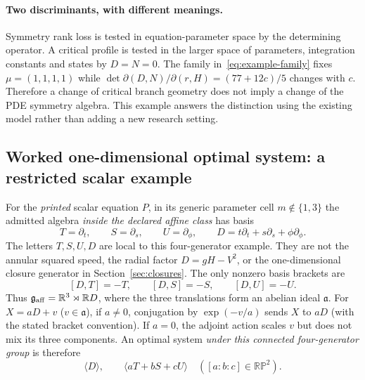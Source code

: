 \documentclass[12pt,a4paper,oneside]{report}
\numberwithin{equation}{chapter}
\theoremstyle{remark}\newtheorem{remark}[theorem]{Remark}
\begin{document}
\paragraph{Two discriminants, with different meanings.}
Symmetry rank loss is tested in equation-parameter space by the determining
operator. A critical profile is tested in the larger space of parameters,
integration constants and states by $D=N=0$. The family
in~\eqref{eq:example-family} fixes $\mu=(1,1,1,1)$ while
$\det\partial(D,N)/\partial(r,H)=(77+12c)/5$ changes with $c$.
Therefore a change of critical branch geometry does not imply a change of
the PDE symmetry algebra. This example answers the distinction using the
existing model rather than adding a new research setting.


\subsection{Worked one-dimensional optimal system: a restricted scalar example}
For the \emph{printed} scalar equation $P$, in its generic parameter cell
$m\notin\{1,3\}$ the admitted algebra \emph{inside the declared affine
class} has basis
\begin{equation}\label{eq:generic-scalar-basis}
 T=\partial_t,\qquad S=\partial_s,\qquad U=\partial_\phi,
 \qquad D=t\partial_t+s\partial_s+\phi\partial_\phi.
\end{equation}
The letters $T,S,U,D$ are local to this four-generator example. They are
not the annular squared speed, the radial factor $D=gH-V^2$, or the
one-dimensional closure generator in Section~\ref{sec:closures}.
The only nonzero basis brackets are
\begin{equation}\label{eq:generic-scalar-brackets}
 [D,T]=-T,\qquad [D,S]=-S,\qquad [D,U]=-U.
\end{equation}
Thus $\mathfrak g_{\rm aff}=\mathbb R^3\rtimes\mathbb R D$,
where the three translations form an abelian ideal $\mathfrak a$.
For $X=aD+v$ ($v\in\mathfrak a$), if $a\ne0$, conjugation by
$\exp(-v/a)$ sends $X$ to $aD$ (with the stated bracket convention).
If $a=0$, the adjoint action scales $v$ but does not mix its three
components. An optimal system \emph{under this connected four-generator
group} is therefore
\begin{equation}\label{eq:optimal-generic-P}
 \boxed{\quad \langle D\rangle,\qquad
 \langle aT+bS+cU\rangle\quad([a:b:c]\in\mathbb{RP}^{2}).\quad}
\end{equation}
\end{document}
